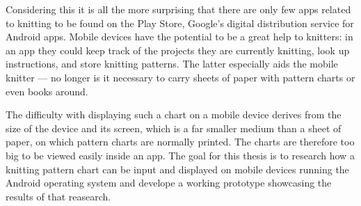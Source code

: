Considering this it is all the more surprising that there are only few apps related to knitting to be found on the Play Store, Google's digital distribution service for Android apps. Mobile devices have the potential to be a great help to knitters: in an app they could keep track of the projects they are currently knitting, look up instructions, and store knitting patterns. The latter especially aids the mobile knitter --- no longer is it necessary to carry sheets of paper with pattern charts or even books around.

The difficulty with displaying such a chart on a mobile device derives from the size of the device and its screen, which is a far smaller medium than a sheet of paper, on which pattern charts are normally printed. The charts are therefore too big to be viewed easily inside an app. The goal for this thesis is to research how a knitting pattern chart can be input and displayed on mobile devices running the Android operating system and develope a working prototype showcasing the results of that reasearch.